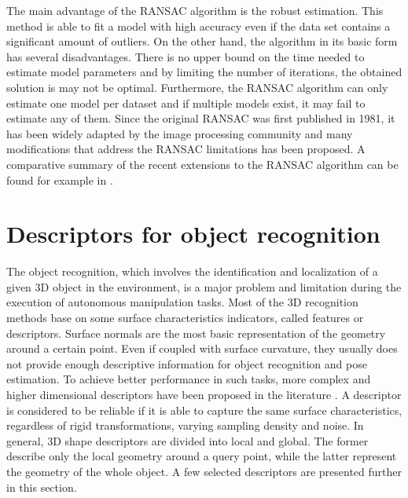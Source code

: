 The main advantage of the RANSAC algorithm is the robust estimation. This method is able to fit a model with high accuracy even if the data set contains a significant amount of outliers. On the other hand, the algorithm in its basic form has several disadvantages. There is no upper bound on the time needed to estimate model parameters and by limiting the number of iterations, the obtained solution is may not be optimal. Furthermore, the RANSAC algorithm can only estimate one model per dataset and if multiple models exist, it may fail to estimate any of them. Since the original RANSAC was first published in 1981, it has been widely adapted by the image processing community and many modifications that address the RANSAC limitations has been proposed. A comparative summary of the recent extensions to the RANSAC algorithm can be found for example in \cite{ransacsurvey}.




\section{Descriptors for object recognition}
\label{sec:descriptors}

The object recognition, which involves the identification and localization of a given 3D object in the environment, is a major problem and limitation during the execution of autonomous manipulation tasks. Most of the 3D recognition methods base on some surface characteristics indicators, called features or descriptors. Surface normals are the most basic representation of the geometry around a certain point. Even if coupled with surface curvature, they usually does not provide enough descriptive information for object recognition and pose estimation. To achieve better performance in such tasks, more complex and higher dimensional descriptors have been proposed in the literature \cite{descriptorssummary}. A descriptor is considered to be reliable if it is able to capture the same surface characteristics, regardless of rigid transformations, varying sampling density and noise. In general, 3D shape descriptors are divided into local and global. The former describe only the local geometry around a query point, while the latter represent the geometry of the whole object. A few selected descriptors are presented further in this section.

